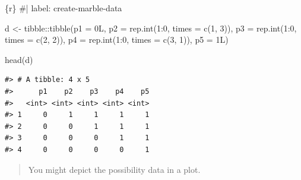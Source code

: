 \documentclass[
  letterpaper,
  DIV=11,
  numbers=noendperiod]{scrreprt}
\newenvironment{Shaded}{\begin{snugshade}}{\end{snugshade}}
\newcommand{\AttributeTok}[1]{\textcolor[rgb]{0.40,0.45,0.13}{#1}}
\newcommand{\CommentTok}[1]{\textcolor[rgb]{0.37,0.37,0.37}{#1}}
\newcommand{\DecValTok}[1]{\textcolor[rgb]{0.68,0.00,0.00}{#1}}
\newcommand{\FunctionTok}[1]{\textcolor[rgb]{0.28,0.35,0.67}{#1}}
\newcommand{\InformationTok}[1]{\textcolor[rgb]{0.37,0.37,0.37}{#1}}
\newcommand{\NormalTok}[1]{\textcolor[rgb]{0.00,0.23,0.31}{#1}}
\newcommand{\OtherTok}[1]{\textcolor[rgb]{0.00,0.23,0.31}{#1}}
\newcommand{\SpecialCharTok}[1]{\textcolor[rgb]{0.37,0.37,0.37}{#1}}
\begin{document}
\begin{Shaded}
\begin{Highlighting}[]
\InformationTok{\textasciigrave{}\textasciigrave{}\textasciigrave{}\{r\}}
\CommentTok{\#| label: create{-}marble{-}data}

\NormalTok{d }\OtherTok{\textless{}{-}}
\NormalTok{  tibble}\SpecialCharTok{::}\FunctionTok{tibble}\NormalTok{(}\AttributeTok{p1 =}\NormalTok{ 0L,}
         \AttributeTok{p2 =} \FunctionTok{rep.int}\NormalTok{(}\DecValTok{1}\SpecialCharTok{:}\DecValTok{0}\NormalTok{, }\AttributeTok{times =} \FunctionTok{c}\NormalTok{(}\DecValTok{1}\NormalTok{, }\DecValTok{3}\NormalTok{)),}
         \AttributeTok{p3 =} \FunctionTok{rep.int}\NormalTok{(}\DecValTok{1}\SpecialCharTok{:}\DecValTok{0}\NormalTok{, }\AttributeTok{times =} \FunctionTok{c}\NormalTok{(}\DecValTok{2}\NormalTok{, }\DecValTok{2}\NormalTok{)),}
         \AttributeTok{p4 =} \FunctionTok{rep.int}\NormalTok{(}\DecValTok{1}\SpecialCharTok{:}\DecValTok{0}\NormalTok{, }\AttributeTok{times =} \FunctionTok{c}\NormalTok{(}\DecValTok{3}\NormalTok{, }\DecValTok{1}\NormalTok{)),}
         \AttributeTok{p5 =}\NormalTok{ 1L)}

\FunctionTok{head}\NormalTok{(d)}
\InformationTok{\textasciigrave{}\textasciigrave{}\textasciigrave{}}
\end{Highlighting}
\end{Shaded}

\begin{verbatim}
#> # A tibble: 4 x 5
#>      p1    p2    p3    p4    p5
#>   <int> <int> <int> <int> <int>
#> 1     0     1     1     1     1
#> 2     0     0     1     1     1
#> 3     0     0     0     1     1
#> 4     0     0     0     0     1
\end{verbatim}

\begin{quote}
You might depict the possibility data in a plot.
\end{quote}
\end{document}
